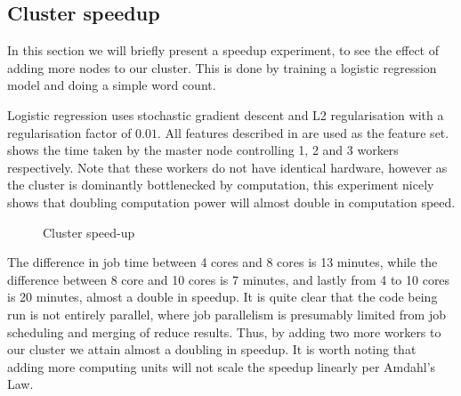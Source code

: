 \subsection{Cluster speedup}\label{sec:speedup}
In this section we will briefly present a speedup experiment, to see the effect of adding more nodes to our cluster. This is done by training a logistic regression model and doing a simple word count. 

Logistic regression uses stochastic gradient descent and L2 regularisation with a regularisation factor of $0.01$. All features described in  are used as the feature set.  shows the time taken by the master node controlling 1, 2 and 3 workers respectively. Note that these workers do not have identical hardware, however as the cluster is dominantly bottlenecked by computation, this experiment nicely shows that doubling computation power will almost double in computation speed.


\begin{figure}[!htb]
  \centering
   \caption{Cluster speed-up}\label{fig:cluster-speedup}
\end{figure}
The difference in job time between 4 cores and 8 cores is 13 minutes, while the difference between 8 core and 10 cores is 7 minutes, and lastly from 4 to 10 cores is 20 minutes, almost a double in speedup. It is quite clear that the code being run is not entirely parallel, where job parallelism is presumably limited from job scheduling and merging of reduce results. Thus, by adding two more workers to our cluster we attain almost a doubling in speedup. It is worth noting that adding more computing units will not scale the speedup linearly per Amdahl's Law.

